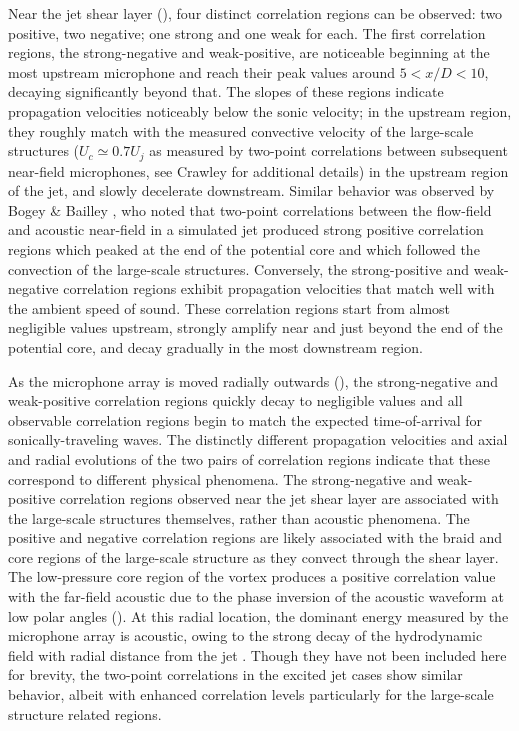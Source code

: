 Near the jet shear layer (), four distinct correlation regions can be observed: two positive, two negative; one strong and one weak for each. 
The first correlation regions, the strong-negative and weak-positive, are noticeable beginning at the most upstream microphone and reach their peak values around $5 < x/D < 10$, decaying significantly beyond that.
The slopes of these regions indicate propagation velocities noticeably below the sonic velocity; in the upstream region, they roughly match with the measured convective velocity of the large-scale structures ($U_c \simeq 0.7 U_j$ as measured by two-point correlations between subsequent near-field microphones, see Crawley \etal \citep{Crawley2015} for additional details) in the upstream region of the jet, and slowly decelerate downstream.
Similar behavior was observed by Bogey \& Bailley \citep{Bogey2007}, who noted that two-point correlations between the flow-field and acoustic near-field in a simulated jet produced strong positive correlation regions which peaked at the end of the potential core and which followed the convection of the large-scale structures.
Conversely, the strong-positive and weak-negative correlation regions exhibit propagation velocities that match well with the ambient speed of sound. 
These correlation regions start from almost negligible values upstream, strongly amplify near and just beyond the end of the potential core, and decay gradually in the most downstream region.

As the microphone array is moved radially outwards (), the strong-negative and weak-positive correlation regions quickly decay to negligible values and all observable correlation regions begin to match the expected time-of-arrival for sonically-traveling waves. 
The distinctly different propagation velocities and axial and radial evolutions of the two pairs of correlation regions indicate that these correspond to different physical phenomena.
The strong-negative and weak-positive correlation regions observed near the jet shear layer are associated with the large-scale structures themselves, rather than acoustic phenomena. 
The positive and negative correlation regions are likely associated with the braid and core regions of the large-scale structure as they convect through the shear layer. 
The low-pressure core region of the vortex produces a positive correlation value with the far-field acoustic due to the phase inversion of the acoustic waveform at low polar angles (). 
At this radial location, the dominant energy measured by the microphone array is acoustic, owing to the strong decay of the hydrodynamic field with radial distance from the jet \citep{Arndt1997}.
Though they have not been included here for brevity, the two-point correlations in the excited jet cases show similar behavior, albeit with enhanced correlation levels particularly for the large-scale structure related regions. 

